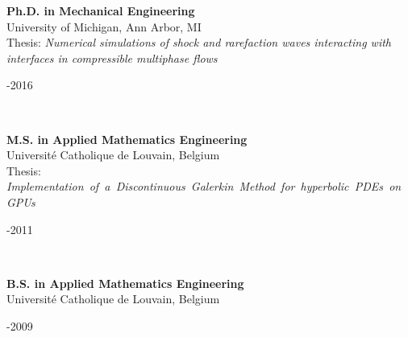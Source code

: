 \documentclass[11pt,letterpaper]{article}
\newcommand{\raisedrule}[2][0em]{\leaders\hbox{\rule[#1]{1pt}{#2}}\hfill}
\newcommand*{\sectionfont}{\Large\sffamily\mdseries\upshape}
\begin{document}
\begin{minipage}[t]{0.82\textwidth}%
  \textbf{Ph.D. in Mechanical Engineering}\\%
  University of Michigan, Ann Arbor, MI\\%
  Thesis: \textit{Numerical simulations of shock and rarefaction waves interacting with interfaces in compressible multiphase flows}%
\end{minipage}\hfill%
\begin{minipage}[t]{0.15\textwidth}-2016%
\end{minipage}\\[2ex]%
\begin{minipage}[t]{0.82\textwidth}%
  \textbf{M.S. in Applied Mathematics Engineering}\\%
  Universit\'{e} Catholique de Louvain, Belgium\\%
  Thesis: \textit{\mbox{Implementation of a Discontinuous Galerkin Method for hyperbolic PDEs on GPUs}}%
\end{minipage}\hfill%
\begin{minipage}[t]{0.15\textwidth}-2011%
\end{minipage}\\[2ex]%
\begin{minipage}[t]{0.82\textwidth}%
  \textbf{B.S. in Applied Mathematics Engineering}\\%
  Universit\'{e} Catholique de Louvain, Belgium%
\end{minipage}\hfill%
\begin{minipage}[t]{0.15\textwidth}-2009%
\end{minipage}\\[3ex]%
%
%
%
%
\end{document}
